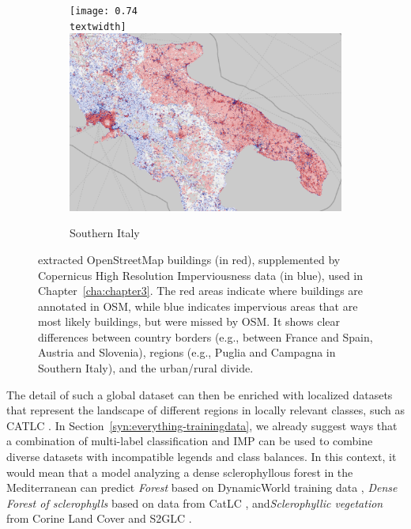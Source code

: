             \begin{figure}
            \begin{subfigure}[t]{0.24\textwidth}
            \centering
            \texttt{[image: 0.74\\textwidth]}
            \centering
            \includegraphics[width=0.75\linewidth]{figs_06/osm_vs_cop_italy.png}
            \caption{Southern Italy}
            \label{fig:osm_vs_cop_italy}
            \end{subfigure}
            \caption{extracted OpenStreetMap buildings (in red), supplemented by Copernicus High Resolution Imperviousness data (in blue), used in Chapter\@~\ref{cha:chapter3}. The red areas indicate where buildings are annotated in OSM, while blue indicates impervious areas that are most likely buildings, but were missed by OSM. It shows clear differences between country borders (e.g., between France and Spain, Austria and Slovenia), regions (e.g., Puglia and Campagna in Southern Italy), and the urban/rural divide.}
            \label{fig:osm_vs_cop_europe}
            \end{figure}
            
            The detail of such a global dataset can then be enriched with localized datasets that represent the landscape of different regions in locally relevant classes, such as CATLC \citep{garcia2022catlc}. In Section\@~\ref{syn:everything-trainingdata}, we already suggest ways that a combination of multi-label classification and IMP can be used to combine diverse datasets with incompatible legends and class balances. In this context, it would mean that a model analyzing a dense sclerophyllous forest in the Mediterranean can predict \textit{Forest} based on DynamicWorld training data \citep{tait2021dwtd}, \textit{Dense Forest of sclerophylls} based on data from CatLC \citep{garcia2022catlc}, and\textit{Sclerophyllic vegetation} from Corine Land Cover and S2GLC \citep{jenerowicz2021validation}. 

